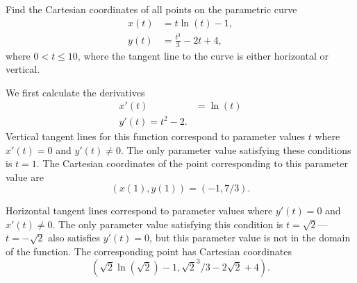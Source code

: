 \documentclass[]{ximera}
\begin{document}
\begin{problem}
Find the Cartesian coordinates of all points on the parametric curve
\begin{align*}
x(t) &= t \ln (t) - 1,\\
y(t) &= \frac{t^3}{3}-2t + 4,
\end{align*}
where $0< t \leq 10$, where the tangent line to the curve is either horizontal or vertical.

\begin{solution}
We first calculate the derivatives
\begin{align*}
x'(t) &= \ln(t) \\
y'(t) = t^2 - 2.
\end{align*}
Vertical tangent lines for this function correspond to parameter values $t$ where $x'(t) = 0$ and $y'(t) \neq 0$. The only parameter value satisfying these conditions is $t=1$. The Cartesian coordinates of the point corresponding to this parameter value are 
$$
(x(1),y(1)) = (-1,7/3).
$$

Horizontal tangent lines correspond to parameter values where $y'(t) = 0$ and $x'(t) \neq 0$. The only parameter value satisfying this condition is $t = \sqrt{2}$---$t = -\sqrt{2}$ also satisfies $y'(t) = 0$, but this parameter value is not in the domain of the function. The corresponding point has Cartesian coordinates
$$
(\sqrt{2} \ln(\sqrt{2}) - 1, \sqrt{2}^3/3 - 2 \sqrt{2} + 4).
$$
\end{solution}
\end{problem}
\end{document}
